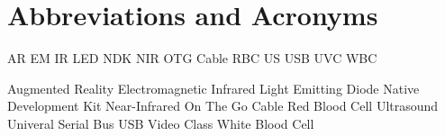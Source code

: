 \chapter{Abbreviations and Acronyms}\label{chapter:abbreviations}

\begin{multicols}{2}
\setlength{\parindent}{0pt}

	AR
	\hfill \break 
	EM
	\hfill \break 
	IR
	\hfill \break 
	LED
	\hfill \break 
	NDK
	\hfill \break
	NIR
	\hfill \break 
	OTG Cable
	\hfill \break 
	RBC
	\hfill \break 
	US
	\hfill \break 
	USB
	\hfill \break
	UVC	
	\hfill \break 
	WBC



	
\columnbreak
 
	Augmented Reality
	\hfill \break 
	Electromagnetic
	\hfill \break 
	Infrared
	\hfill \break 
	Light Emitting Diode
 	\hfill \break
	Native Development Kit 
	\hfill \break
	Near-Infrared
 	\hfill \break
	On The Go Cable
	\hfill \break
	Red Blood Cell 
	\hfill \break
	Ultrasound
	\hfill \break 
	Univeral Serial Bus
	\hfill \break 
	USB Video Class
	\hfill \break
	White Blood Cell 

\end{multicols}